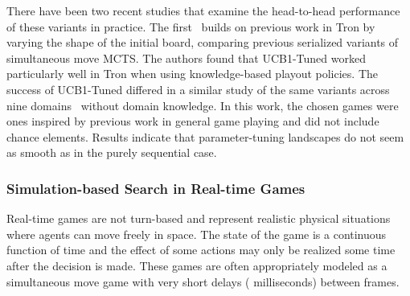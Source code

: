 There have been two recent studies that examine the head-to-head performance of these variants in practice. 
The first~\cite{Lanctot13Tron} builds on previous work in Tron by varying the shape of the initial board, 
comparing previous serialized variants of simultaneous move MCTS. The authors found that UCB1-Tuned worked 
particularly well in Tron when using knowledge-based playout policies. The success of UCB1-Tuned differed in 
a similar study of the same variants across nine domains~\cite{Tak14smmcts} without domain knowledge. In this 
work, the chosen games were ones inspired by previous work in general game playing and did not include chance elements. 
Results indicate that parameter-tuning landscapes do not seem as smooth as in the purely sequential case. 


\subsubsection{Simulation-based Search in Real-time Games}


Real-time games are not turn-based and represent realistic physical situations where agents can move freely in space. 
The state of the game is a continuous function of time and the effect of some actions may only be realized some time 
after the decision is made. These games are often appropriately modeled as a simultaneous move game with very short 
delays ( milliseconds) between frames. 

